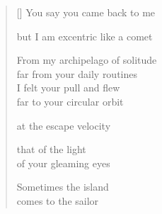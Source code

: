 \documentclass[12pt,a4paper]{article}
\begin{document}
\thispagestyle{empty}

\poemtitle{}

\settowidth{\versewidth}{From my archipelago of solitude}

\bigskip

\begin{verse}[\versewidth]
  You say you came back to me

  but I am excentric like a comet

  From my archipelago of solitude \\
  far from your daily routines\\
  I felt your pull and flew\\
  far to your circular orbit

  at the escape velocity

  that of the light \\
  of your gleaming eyes

  Sometimes the island \\
  comes to the sailor
\end{verse}
\end{document}
